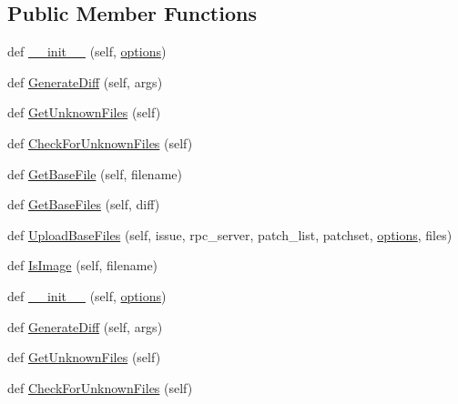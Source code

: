 \subsection*{Public Member Functions}
\begin{DoxyCompactItemize}
\item 
def \hyperlink{classupload_1_1VersionControlSystem_ace97e5785a2b40011404ae6fbb956ecf}{\+\_\+\+\_\+init\+\_\+\+\_\+} (self, \hyperlink{classupload_1_1VersionControlSystem_a4d57d043bc408887b94269fe4cea9556}{options})
\item 
def \hyperlink{classupload_1_1VersionControlSystem_aa5eb260c96e7016dab36b5fc136c9f49}{Generate\+Diff} (self, args)
\item 
def \hyperlink{classupload_1_1VersionControlSystem_a56a60e56aa9aff3df4001d2f84cab884}{Get\+Unknown\+Files} (self)
\item 
def \hyperlink{classupload_1_1VersionControlSystem_ad2923d691a1b1047e9359c5b7c1c103f}{Check\+For\+Unknown\+Files} (self)
\item 
def \hyperlink{classupload_1_1VersionControlSystem_adfd9d4ecba422102233a2ba13e5bfaf5}{Get\+Base\+File} (self, filename)
\item 
def \hyperlink{classupload_1_1VersionControlSystem_a812c3b3daf90c88b015fa4b26252e291}{Get\+Base\+Files} (self, diff)
\item 
def \hyperlink{classupload_1_1VersionControlSystem_a7e334f967301b9e85e5a9c39f5036823}{Upload\+Base\+Files} (self, issue, rpc\+\_\+server, patch\+\_\+list, patchset, \hyperlink{classupload_1_1VersionControlSystem_a4d57d043bc408887b94269fe4cea9556}{options}, files)
\item 
def \hyperlink{classupload_1_1VersionControlSystem_a846889ecd2ef40870b456ddb5b349e02}{Is\+Image} (self, filename)
\item 
def \hyperlink{classupload_1_1VersionControlSystem_ace97e5785a2b40011404ae6fbb956ecf}{\+\_\+\+\_\+init\+\_\+\+\_\+} (self, \hyperlink{classupload_1_1VersionControlSystem_a4d57d043bc408887b94269fe4cea9556}{options})
\item 
def \hyperlink{classupload_1_1VersionControlSystem_aa5eb260c96e7016dab36b5fc136c9f49}{Generate\+Diff} (self, args)
\item 
def \hyperlink{classupload_1_1VersionControlSystem_a56a60e56aa9aff3df4001d2f84cab884}{Get\+Unknown\+Files} (self)
\item 
def \hyperlink{classupload_1_1VersionControlSystem_ad2923d691a1b1047e9359c5b7c1c103f}{Check\+For\+Unknown\+Files} (self)
\item 

\end{DoxyCompactItemize}
